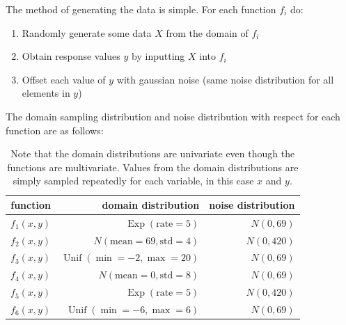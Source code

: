 \documentclass[12pt]{article}
\begin{document}
        The method of generating the data is simple. For each function $f_i$ do:
        \begin{enumerate}
            \item Randomly generate some data $X$ from the domain of $f_i$
            \item Obtain response values $y$ by inputting $X$ into $f_i$
            \item Offset each value of $y$ with gaussian noise (same noise distribution for all elements in $y$)
        \end{enumerate}

        The domain sampling distribution and noise distribution with respect for each function are as follows:
        \begin{table}[H]
            \centering
            \caption{Note that the domain distributions are univariate even though the functions are multivariate. Values from the domain distributions are simply sampled repeatedly for each variable, in this case $x$ and $y$.}
            \begin{tabular}{crr}
                \toprule
                function & domain distribution & noise distribution \\ 
                \midrule
                $f_1(x,y)$ & $\operatorname{Exp}(\text{rate}=5)$    & $N(0,69)$  \\
                $f_2(x,y)$ & $N(\text{mean}=69, \text{std}=4)$      & $N(0,420)$ \\
                $f_3(x,y)$ & $\operatorname{Unif}(\min=-2,\max=20)$ & $N(0,69)$  \\ 
                $f_4(x,y)$ & $N(\text{mean}=0, \text{std}=8)$       & $N(0,69)$  \\
                $f_5(x,y)$ & $\operatorname{Exp}(\text{rate}=5)$    & $N(0,420)$ \\
                $f_6(x,y)$ & $\operatorname{Unif}(\min=-6,\max=6)$  & $N(0,69)$  \\
                \bottomrule
            \end{tabular}
        \end{table}
\end{document}

